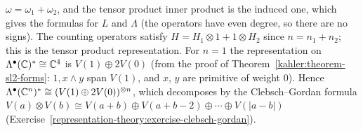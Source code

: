 \begin{solution}
$\omega = \omega_1 + \omega_2$, and the tensor product inner product is the induced one, which gives the formulas for $L$ and $\Lambda$ (the
operators have even degree, so there are no signs). The counting operators satisfy $H = H_1 \otimes 1 + 1 \otimes H_2$ since $n = n_1 + n_2$;
this is the tensor product representation. For $n = 1$ the representation on $\Lambda^\bullet(\mathbb{C})^* \cong \mathbb{C}^4$ is $V(1) \oplus 2V(0)$ (from
the proof of Theorem~\ref{kahler:theorem-sl2-forms}: $1, x \wedge y$ span $V(1)$, and $x$, $y$ are primitive of weight $0$). Hence
$\Lambda^\bullet(\mathbb{C}^n)^* \cong (V(1) \oplus 2V(0))^{\otimes n}$, which decomposes by the Clebsch--Gordan formula $V(a) \otimes V(b) \cong V(a + b) \oplus V(a + b - 2) \oplus \cdots \oplus V(|a - b|)$
(Exercise~\ref{representation-theory:exercise-clebsch-gordan}).
\end{solution}
